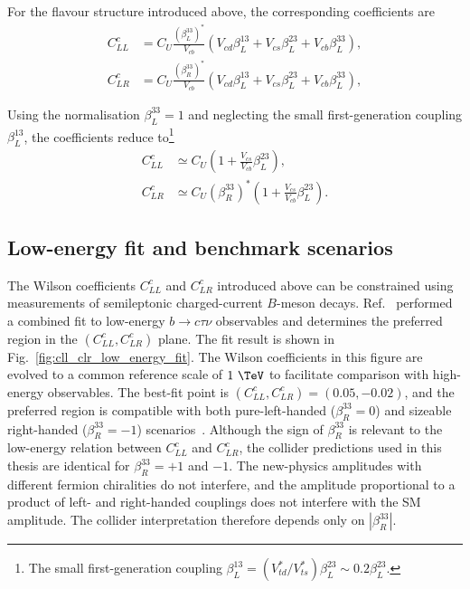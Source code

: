 For the flavour structure introduced above, the corresponding coefficients
are
\begin{align}
    C_{LL}^{c}
    &=
    C_{U}
    \frac{
        \left(\beta_{L}^{33}\right)^{*}
    }{
        V_{cb}
    }
    \left(
        V_{cd}\beta_{L}^{13}
        +
        V_{cs}\beta_{L}^{23}
        +
        V_{cb}\beta_{L}^{33}
    \right),
    \label{eq:cll_c}
    \\
    C_{LR}^{c}
    &=
    C_{U}
    \frac{
        \left(\beta_{R}^{33}\right)^{*}
    }{
        V_{cb}
    }
    \left(
        V_{cd}\beta_{L}^{13}
        +
        V_{cs}\beta_{L}^{23}
        +
        V_{cb}\beta_{L}^{33}
    \right),
    \label{eq:clr_c}
\end{align}

Using the normalisation $\beta_{L}^{33}=1$ and neglecting the small
first-generation coupling $\beta_{L}^{13}$, the coefficients reduce to\footnote{The small first-generation coupling $\beta_L^{13}=(V_{td}^{*}/V_{ts}^{*})\beta_L^{23}\sim0.2\beta_L^{23}$.}
\begin{align}
    C_{LL}^{c}
    &\simeq
    C_{U}
    \left(
        1+
        \frac{V_{cs}}{V_{cb}}\beta_{L}^{23}
    \right),
    \label{eq:cll_c_approx}
    \\
    C_{LR}^{c}
    &\simeq
    C_{U}
    \left(\beta_{R}^{33}\right)^{*}
    \left(
        1+
        \frac{V_{cs}}{V_{cb}}\beta_{L}^{23}
    \right).
    \label{eq:clr_c_approx}
\end{align}

\subsection{Low-energy fit and benchmark scenarios}
\label{subsec:u1_low_energy_fit}

The Wilson coefficients $C_{LL}^{c}$ and $C_{LR}^{c}$ introduced above can be constrained using measurements of semileptonic charged-current $B$-meson decays. Ref.~\cite{Aebischer2022} performed a combined fit to low-energy $b\rightarrow c\tau\nu$ observables and determines the preferred region in the $(C_{LL}^{c},C_{LR}^{c})$ plane. The fit result is shown in Fig.~\ref{fig:cll_clr_low_energy_fit}. The Wilson coefficients in this figure are evolved to a common reference scale of $1~\TeV$ to facilitate comparison with high-energy observables. The best-fit point is $(C_{LL}^{c}, C_{LR}^{c})=(0.05,-0.02)$, and the preferred region is compatible with both pure-left-handed ($\beta_{R}^{33}=0$) and sizeable right-handed ($\beta_{R}^{33}=-1$) scenarios~\cite{Aebischer2022}.
Although the sign of $\beta_R^{33}$ is relevant to the low-energy relation between $C_{LL}^{c}$ and $C_{LR}^{c}$, the collider predictions used in this thesis are identical for $\beta_R^{33}=+1$ and $-1$. The new-physics amplitudes with different fermion chiralities do not interfere, and the amplitude proportional to a product of left- and right-handed couplings does not interfere with the SM amplitude. The collider interpretation therefore depends only on $|\beta_R^{33}|$.

